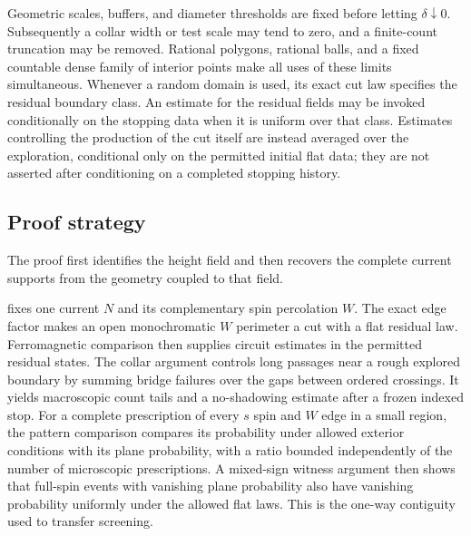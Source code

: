 Geometric scales, buffers, and diameter thresholds are fixed before
letting \(\delta\downarrow0\). Subsequently a collar width or test scale
may tend to zero, and a finite-count truncation may be removed. Rational
polygons, rational balls, and a fixed countable dense family of interior
points make all uses of these limits simultaneous. Whenever a random
domain is used, its exact cut law specifies the residual boundary class.
An estimate for the residual fields may be invoked conditionally on the
stopping data when it is uniform over that class. Estimates controlling
the production of the cut itself are instead averaged over the exploration,
conditional only on the permitted initial flat data; they are not asserted
after conditioning on a completed stopping history.

\subsection{Proof strategy}\label{subsec:proof-strategy}
The proof first identifies the height field and then recovers the complete
current supports from the geometry coupled to that field.

 fixes one current \(N\) and its complementary spin
percolation \(W\). The exact edge factor makes an open monochromatic
\(W\) perimeter a cut with a flat residual law. Ferromagnetic comparison
then supplies circuit estimates in the permitted residual states. The
collar argument controls long passages near a rough explored boundary by
summing bridge failures over the gaps between ordered crossings. It yields
macroscopic count tails and a no-shadowing estimate after a frozen indexed
stop. For a complete prescription of every \(s\) spin and \(W\) edge in a
small region, the pattern comparison compares its probability under allowed
exterior conditions with its plane probability, with a ratio bounded
independently of the number of microscopic prescriptions. A mixed-sign
witness argument then shows that full-spin events with vanishing plane
probability also have vanishing probability uniformly under the allowed flat
laws. This is the one-way contiguity used to transfer screening.

